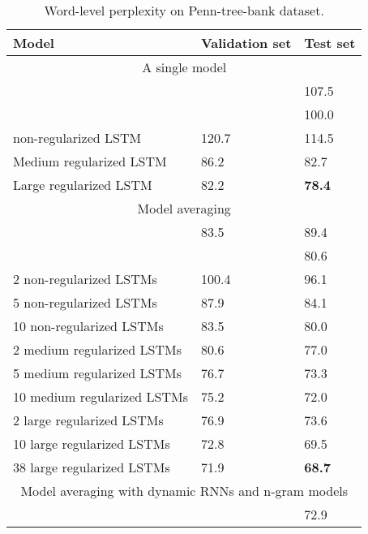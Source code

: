 \documentclass{article}
\begin{document}
\begin{table}[t]
  \small
  \centering
  \renewcommand{\arraystretch}{1.15}
  \begin{tabular}{lll}
    \hline
     Model & Validation set & Test set \\
    \hline
    \multicolumn{3}{c}{A single model} \\
    \hline
    \citet{pascanu2013construct} & & 107.5 \\
    \citet{chenglanguage} & & 100.0 \\
    non-regularized LSTM & 120.7 & 114.5 \\
    Medium regularized LSTM & 86.2 & 82.7 \\
    Large regularized LSTM & 82.2 & {\bf 78.4} \\
    \hline
    \multicolumn{3}{c}{Model averaging} \\
    \hline
    \citet{mikolov2012statistical} & 83.5 & 89.4 \\
    \citet{chenglanguage} & & 80.6 \\
    2 non-regularized LSTMs & 100.4 & 96.1 \\
    5 non-regularized LSTMs & 87.9 & 84.1 \\
    10 non-regularized LSTMs & 83.5 & 80.0 \\
    2 medium regularized LSTMs & 80.6 & 77.0 \\
    5 medium regularized LSTMs & 76.7 & 73.3 \\
    10 medium regularized LSTMs & 75.2 & 72.0 \\
    2 large regularized LSTMs & 76.9 & 73.6 \\
    10 large regularized LSTMs & 72.8 & 69.5 \\
    38 large regularized LSTMs & 71.9 & {\bf 68.7} \\
    \hline
    \multicolumn{3}{c}{Model averaging with dynamic RNNs and n-gram models} \\
    \hline
    \citet{mikolov2012context} & & 72.9 \\
    \hline
  \end{tabular}
  \caption{Word-level perplexity on Penn-tree-bank dataset.}
  \label{tab:ptb}
\end{table}
\end{document}

